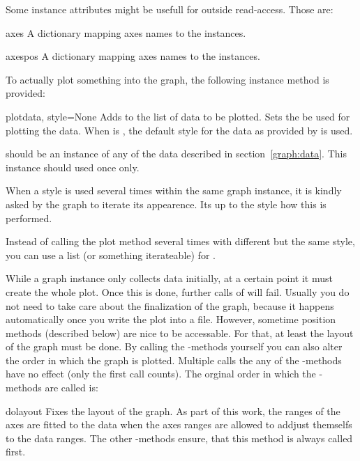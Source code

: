 Some instance attributes might be usefull for outside read-access.
Those are:

\begin{memberdesc}{axes}
  A dictionary mapping axes names to the  instances.
\end{memberdesc}

\begin{memberdesc}{axespos}
  A dictionary mapping axes names to the  instances.
\end{memberdesc}

To actually plot something into the graph, the following instance
method  is provided:

\begin{methoddesc}{plot}{data, style=None}
  Adds  to the list of data to be plotted. Sets 
  the be used for plotting the data. When  is ,
  the default style for the data as provided by  is used.

   should be an instance of any of the data described in
  section~\ref{graph:data}. This instance should used once only.

  When a style is used several times within the same graph instance,
  it is kindly asked by the graph to iterate its appearence. Its up
  to the style how this is performed.

  Instead of calling the plot method several times with different
   but the same style, you can use a list (or something
  iterateable) for .
\end{methoddesc}

While a graph instance only collects data initially, at a certain
point it must create the whole plot. Once this is done, further calls
of  will fail. Usually you do not need to take care
about the finalization of the graph, because it happens automatically
once you write the plot into a file. However, sometime position
methods (described below) are nice to be accessable. For that, at
least the layout of the graph must be done. By calling the
-methods yourself you can also alter the order in which
the graph is plotted. Multiple calls the any of the
-methods have no effect (only the first call counts). The
orginal order in which the -methods are called is:

\begin{methoddesc}{dolayout}{}
  Fixes the layout of the graph. As part of this work, the ranges of
  the axes are fitted to the data when the axes ranges are allowed to
  addjust themselfs to the data ranges. The other -methods
  ensure, that this method is always called first.
\end{methoddesc}

